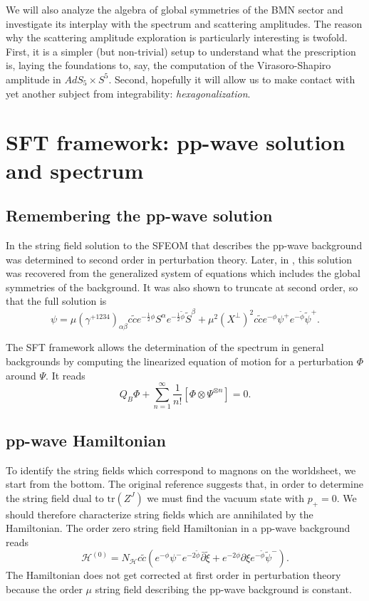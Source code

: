 \documentclass[12pt]{article}
\numberwithin{equation}{section}
\newcommand{\WT}[1]{\widetilde{#1}}
\newcommand{\m}[1]{\mathcal{#1}}
\newcommand{\B}[1]{\bar{#1}}
\begin{document}
We will also analyze the algebra of global symmetries of the BMN sector and investigate its interplay with the spectrum and scattering amplitudes. The reason why the scattering amplitude exploration is particularly interesting is twofold. First, it is a simpler (but non-trivial) setup to understand what the prescription is, laying the foundations to, say, the computation of the Virasoro-Shapiro amplitude in $AdS_5\times S^5$. Second, hopefully it will allow us to make contact with yet another subject from integrability: \textit{hexagonalization}.

\section{SFT framework: pp-wave solution and spectrum}

\subsection{Remembering the pp-wave solution}
In \cite{Cho:2018nfn} the string field solution to the SFEOM that describes the pp-wave background was determined to second order in perturbation theory. Later, in \cite{Cho:2025coy}, this solution was recovered from the generalized system of equations which includes the global symmetries of the background. It was also shown to truncate at second order, so that the full solution is
\begin{equation}
    \psi=\mu(\gamma^{+1234})_{\alpha\beta}c\WT{c}e^{-\frac{1}{2}\phi}S^{\alpha}e^{-\frac{1}{2}\WT{\phi}}\WT{S}^{\beta}+\mu^2(X^{\perp})^2c\WT{c}e^{-\phi}\psi^+e^{-\WT{\phi}}\WT{\psi}^+.
\end{equation}

The SFT framework allows the determination of the spectrum in general backgrounds by computing the linearized equation of motion for a perturbation $\Phi$ around $\Psi$. It reads
\begin{equation}
    Q_B\Phi+\sum_{n=1}^{\infty}\frac{1}{n!}\left[\Phi\otimes\Psi^{\otimes n}\right]=0.
\end{equation}

\subsection{pp-wave Hamiltonian}
To identify the string fields which correspond to magnons on the worldsheet, we start from the bottom. The original reference \cite{Berenstein:2002jq} suggests that, in order to determine the string field dual to $\mathrm{tr}(Z^J)$ we must find the vacuum state with $p_+=0$. We should therefore characterize string fields which are annihilated by the Hamiltonian. The order zero string field Hamiltonian in a pp-wave background reads
\begin{equation}
    \m{H}^{(0)}=N_{\m{H}} c\WT{c}\left( e^{-\phi}\psi^-e^{-2\WT{\phi}}\B{\partial}\WT{\xi}+e^{-2\phi}\partial\xi e^{-\WT{\phi}}\WT{\psi}^- \right).
\end{equation}
The Hamiltonian does not get corrected at first order in perturbation theory because the order $\mu$ string field describing the pp-wave background is constant. 
\end{document}
